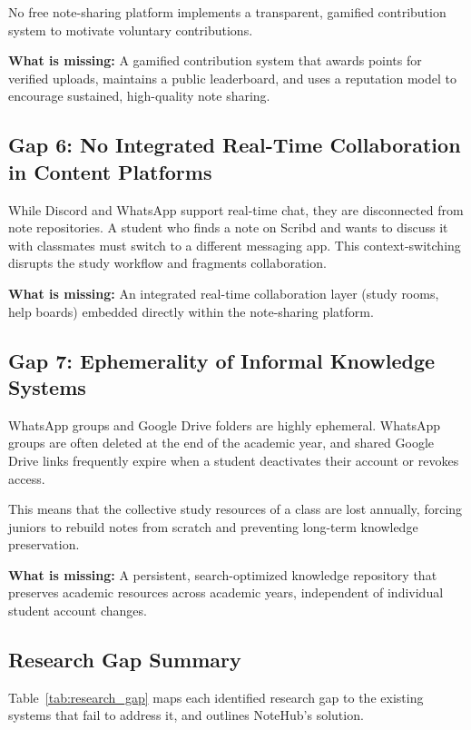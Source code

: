 \documentclass[12,Times new Roman,a4paper]{report}
\begin{document}
No free note-sharing platform implements a transparent, gamified contribution system to motivate voluntary contributions.

\textbf{What is missing:} A gamified contribution system that awards points for verified uploads, maintains a public leaderboard, and uses a reputation model to encourage sustained, high-quality note sharing.

\subsection{Gap 6: No Integrated Real-Time Collaboration in Content Platforms}
While Discord and WhatsApp support real-time chat, they are disconnected from note repositories. A student who finds a note on Scribd and wants to discuss it with classmates must switch to a different messaging app. This context-switching disrupts the study workflow and fragments collaboration.

\textbf{What is missing:} An integrated real-time collaboration layer (study rooms, help boards) embedded directly within the note-sharing platform.

\subsection{Gap 7: Ephemerality of Informal Knowledge Systems}
WhatsApp groups and Google Drive folders are highly ephemeral. WhatsApp groups are often deleted at the end of the academic year, and shared Google Drive links frequently expire when a student deactivates their account or revokes access.

This means that the collective study resources of a class are lost annually, forcing juniors to rebuild notes from scratch and preventing long-term knowledge preservation.

\textbf{What is missing:} A persistent, search-optimized knowledge repository that preserves academic resources across academic years, independent of individual student account changes.

\subsection{Research Gap Summary}
Table~\ref{tab:research_gap} maps each identified research gap to the existing systems that fail to address it, and outlines NoteHub's solution.
\end{document}
